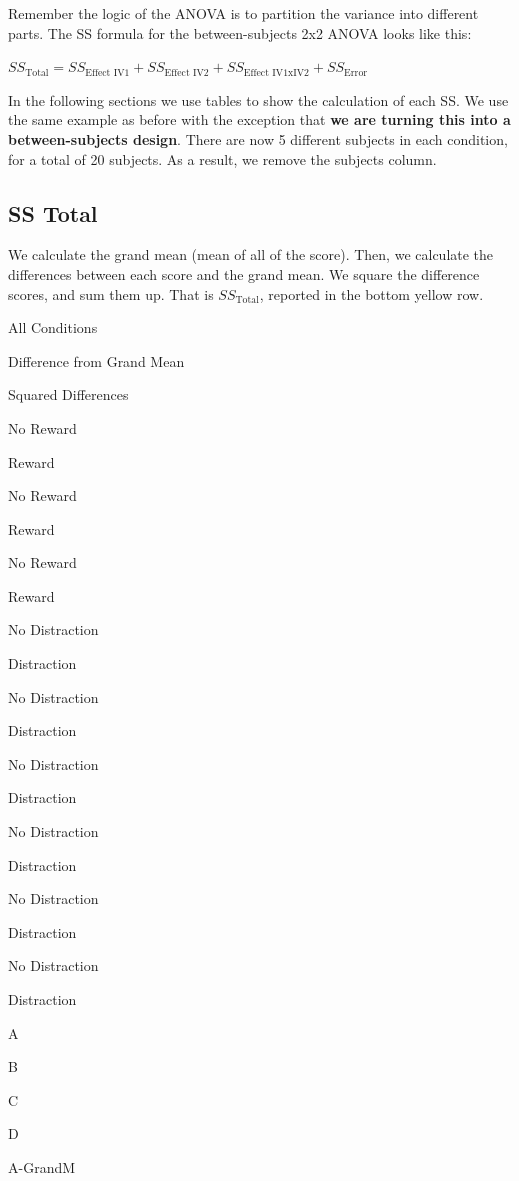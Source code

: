 \documentclass[]{book}
\begin{document}
Remember the logic of the ANOVA is to partition the variance into different parts. The SS formula for the between-subjects 2x2 ANOVA looks like this:

\(SS_\text{Total} = SS_\text{Effect IV1} + SS_\text{Effect IV2} + SS_\text{Effect IV1xIV2} + SS_\text{Error}\)

In the following sections we use tables to show the calculation of each SS. We use the same example as before with the exception that \textbf{we are turning this into a between-subjects design}. There are now 5 different subjects in each condition, for a total of 20 subjects. As a result, we remove the subjects column.

\hypertarget{ss-total}{%
\subsection{SS Total}\label{ss-total}}

We calculate the grand mean (mean of all of the score). Then, we calculate the differences between each score and the grand mean. We square the difference scores, and sum them up. That is \(SS_\text{Total}\), reported in the bottom yellow row.

All Conditions

Difference from Grand Mean

Squared Differences

No Reward

Reward

No Reward

Reward

No Reward

Reward

No Distraction

Distraction

No Distraction

Distraction

No Distraction

Distraction

No Distraction

Distraction

No Distraction

Distraction

No Distraction

Distraction

A

B

C

D

A-GrandM
\end{document}
